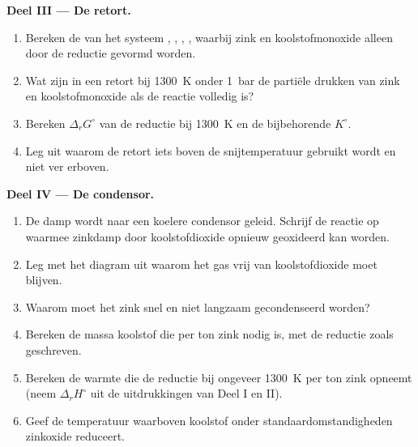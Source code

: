 \begin{problem}
\medskip
\noindent\textbf{Deel III --- De retort.}
\begin{enumerate}[resume]
  \item Bereken de  van het systeem , , ,
        , waarbij zink en koolstofmonoxide alleen door de reductie gevormd worden.
  \item Wat zijn in een retort bij \qty{1300}{K} onder \qty{1}{bar} de partiële
        drukken van zink en koolstofmonoxide als de reactie volledig is?
  \item Bereken $\Delta_r G^\circ$ van de reductie bij \qty{1300}{K} en de
        bijbehorende $K^\circ$.
  \item Leg uit waarom de retort iets boven de snijtemperatuur gebruikt wordt
        en niet ver erboven.
\end{enumerate}

\medskip
\noindent\textbf{Deel IV --- De condensor.}
\begin{enumerate}[resume]
  \item De damp wordt naar een koelere condensor geleid. Schrijf de reactie op waarmee
        zinkdamp door koolstofdioxide opnieuw geoxideerd kan worden.
  \item Leg met het diagram uit waarom het gas vrij van koolstofdioxide moet
        blijven.
  \item Waarom moet het zink snel en niet langzaam gecondenseerd worden?
  \item Bereken de massa koolstof die per ton zink nodig is, met de
        reductie zoals geschreven.
  \item Bereken de warmte die de reductie bij ongeveer \qty{1300}{K} per ton zink
        opneemt (neem $\Delta_r H^\circ$ uit de uitdrukkingen van Deel I
        en II).
  \item Geef de temperatuur waarboven koolstof onder standaardomstandigheden
        zinkoxide reduceert.
\end{enumerate}
\end{problem}
